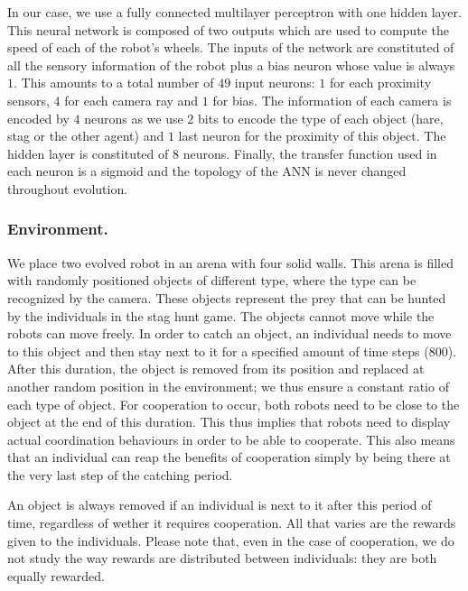     In our case, we use a fully connected multilayer perceptron with one hidden layer. This neural network is composed of two outputs which are used to compute the speed of each of the robot's wheels. The inputs of the network are constituted of all the sensory information of the robot plus a bias neuron whose value is always $1$. This amounts to a total number of $49$ input neurons: $1$ for each proximity sensors, $4$ for each camera ray and $1$ for bias. The information of each camera is encoded by $4$ neurons as we use $2$ bits to encode the type of each object (hare, stag or the other agent) and $1$ last neuron for the proximity of this object. The hidden layer is constituted of $8$ neurons. Finally, the transfer function used in each neuron is a sigmoid and the topology of the ANN is never changed throughout evolution.

    \subsubsection{Environment.} We place two evolved robot in an arena with four solid walls. This arena is filled with randomly positioned objects of different type, where the type can be recognized by the camera. These objects represent the prey that can be hunted by the individuals in the stag hunt game. The objects cannot move while the robots can move freely. In order to catch an object, an individual needs to move to this object and then stay next to it for a specified amount of time steps ($800$). After this duration, the object is removed from its position and replaced at another random position in the environment; we thus ensure a constant ratio of each type of object. For cooperation to occur, both robots need to be close to the object at the end of this duration. This thus implies that robots need to display actual coordination behaviours in order to be able to cooperate. This also means that an individual can reap the benefits of cooperation simply by being there at the very last step of the catching period.

    An object is always removed if an individual is next to it after this period of time, regardless of wether it requires cooperation. All that varies are the rewards given to the individuals. Please note that, even in the case of cooperation, we do not study the way rewards are distributed between individuals: they are both equally rewarded.


